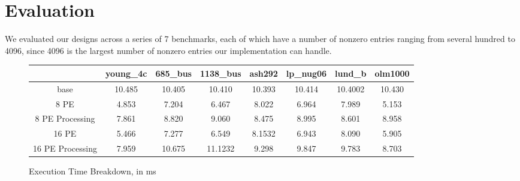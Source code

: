 \documentclass[10pt]{article}
\begin{document}
\section{Evaluation}

\noindent We evaluated our designs across a series of 7 benchmarks, each of which have a number of nonzero entries ranging
from several hundred to 4096, since 4096 is the largest number of nonzero entries our implementation can handle. 

\begin{figure}[h!]
  \centering
  \begin{tabular} {| c | c | c | c | c | c | c | c |}
    \hline
                    & young\_4c & 685\_bus & 1138\_bus & ash292 & lp\_nug06 & lund\_b & olm1000 \\
    \hline
    base            & 10.485    & 10.405   & 10.410    & 10.393 & 10.414    & 10.4002 & 10.430 \\
    \hline
    8 PE            & 4.853     & 7.204    & 6.467     & 8.022  & 6.964     & 7.989   & 5.153 \\
    \hline
    8 PE Processing & 7.861     & 8.820    & 9.060     & 8.475  & 8.995     & 8.601   & 8.958 \\
    \hline
    16 PE           & 5.466     & 7.277    & 6.549     & 8.1532 & 6.943     & 8.090   & 5.905 \\
    \hline
    16 PE Processing& 7.959     & 10.675   &   11.1232 & 9.298  & 9.847     & 9.783   & 8.703 \\
    \hline
  \end{tabular}
  \caption{Execution Time Breakdown, in ms}
  \label{fig:exec_times}
\end{figure}
\end{document}
